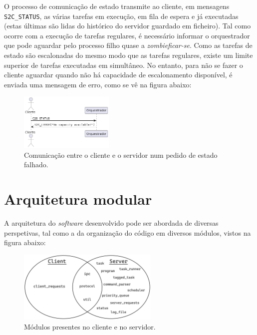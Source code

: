 \documentclass[11pt]{article}
\begin{document}
O processo de comunicação de estado transmite ao cliente, em mensagens \texttt{S2C\_STATUS}, as
várias tarefas em execução, em fila de espera e já executadas (estas últimas são lidas do histórico
do servidor guardado em ficheiro). Tal como ocorre com a execução de tarefas regulares, é
necessário informar o orquestrador que pode aguardar pelo processo filho quase a
\emph{zombieficar-se}. Como as tarefas de estado são escalonadas do mesmo modo que as tarefas
regulares, existe um limite superior de tarefas executadas em simultâneo. No entanto, para não se
fazer o cliente aguardar quando não há capacidade de escalonamento disponível, é enviada uma
mensagem de erro, como se vê na figura abaixo:

\begin{figure}[H]
    \centering
    \includegraphics[width=0.4\textwidth]{report_figures/CommunicationStatusFailure.png}
    \caption{Comunicação entre o cliente e o servidor num pedido de estado falhado.}
\end{figure}

\section{Arquitetura modular}

A arquitetura do \emph{software} desenvolvido pode ser abordada de diversas perspetivas, tal como a
da organização do código em diversos módulos, vistos na figura abaixo: \\

\begin{figure}[H]
    \centering
    \includegraphics[width=0.6\textwidth]{report_figures/modules_venn_diagram.png}
    \caption{Módulos presentes no cliente e no servidor.}
\end{figure}
\end{document}
